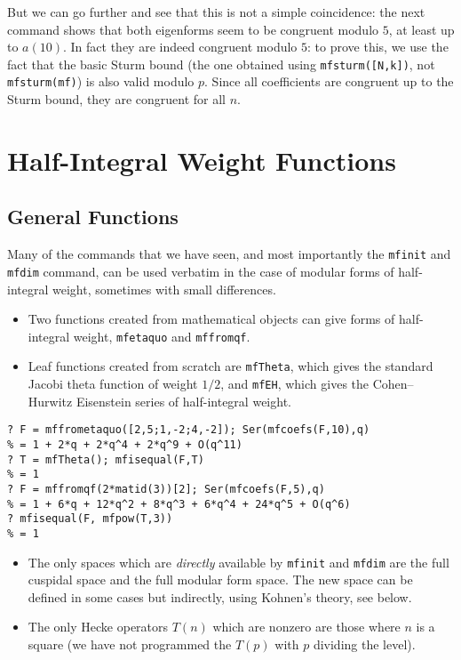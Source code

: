 \documentclass[11pt]{article}
\def\kbd#1{{\tt #1}}
\begin{document}
But we can go further and see that this is not a simple coincidence:
the next command shows that both eigenforms seem to be congruent modulo $5$,
at least up to $a(10)$. In fact they are indeed congruent modulo $5$:
to prove this, we use the fact that the basic Sturm bound (the one obtained
using \kbd{mfsturm([N,k])}, not \kbd{mfsturm(mf)}) is also valid modulo $p$.
Since all coefficients are congruent up to the Sturm bound, they are
congruent for all $n$.

\section{Half-Integral Weight Functions}

\subsection{General Functions}

Many of the commands that we have seen, and most importantly the
\kbd{mfinit} and \kbd{mfdim} command, can be used verbatim in the case
of modular forms of half-integral weight, sometimes with small differences.
\begin{itemize}
\item Two functions created from mathematical objects can give forms
of half-integral weight, \kbd{mfetaquo} and \kbd{mffromqf}.

\item Leaf functions created from scratch are \kbd{mfTheta}, which gives the
standard Jacobi theta function of weight $1/2$, and \kbd{mfEH}, which gives
the Cohen--Hurwitz Eisenstein series of half-integral weight.

\end{itemize}

\begin{verbatim}
? F = mffrometaquo([2,5;1,-2;4,-2]); Ser(mfcoefs(F,10),q)
% = 1 + 2*q + 2*q^4 + 2*q^9 + O(q^11)
? T = mfTheta(); mfisequal(F,T)
% = 1
? F = mffromqf(2*matid(3))[2]; Ser(mfcoefs(F,5),q)
% = 1 + 6*q + 12*q^2 + 8*q^3 + 6*q^4 + 24*q^5 + O(q^6)
? mfisequal(F, mfpow(T,3))
% = 1
\end{verbatim}

\begin{itemize}\item The only spaces which are \emph{directly} available
by \kbd{mfinit} and \kbd{mfdim} are the full cuspidal space and the full
modular form space. The new space can be defined in some cases but indirectly,
using Kohnen's theory, see below.
\item The only Hecke operators $T(n)$ which are nonzero are those where
$n$ is a square (we have not programmed the $T(p)$ with $p$ dividing the
level).
\end{itemize}
\end{document}
